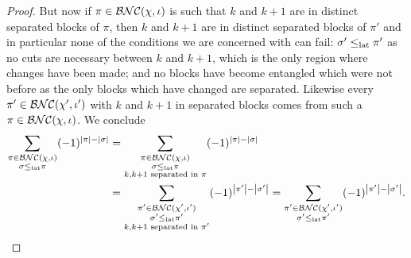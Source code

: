 \begin{proof}
	But now if $\pi \in \mathcal{BNC}(\chi, \iota)$ is such that $k$ and $k+1$ are in distinct separated blocks of $\pi$, then $k$ and $k+1$ are in distinct separated blocks of $\pi'$ and in particular none of the conditions we are concerned with can fail: $\sigma' \leq_{{\operatorname{lat}}}\pi'$ as no cuts are necessary between $k$ and $k+1$, which is the only region where changes have been made; and no blocks have become entangled which were not before as the only blocks which have changed are separated.
	Likewise every $\pi' \in \mathcal{BNC}(\chi', \iota')$ with $k$ and $k+1$ in separated blocks comes from such a $\pi \in \mathcal{BNC}(\chi, \iota)$.
	We conclude
	\begin{align*}
		\sum_{\substack{\pi\in\mathcal{BNC}(\chi, \iota)\\\sigma\leq_{{\operatorname{lat}}}\pi}} (-1)^{\left|\pi\right| - \left|\sigma\right|}
		&= \sum_{\substack{\pi\in\mathcal{BNC}(\chi, \iota)\\\sigma\leq_{{\operatorname{lat}}}\pi \\ k, k+1 \text{ separated in } \pi}} (-1)^{\left|\pi\right| - \left|\sigma\right|} \\
		&= \sum_{\substack{\pi'\in\mathcal{BNC}(\chi', \iota')\\\sigma'\leq_{{\operatorname{lat}}}\pi' \\ k, k+1 \text{ separated in } \pi'}} (-1)^{\left|\pi'\right| - \left|\sigma'\right|}
		= \sum_{\substack{\pi'\in\mathcal{BNC}(\chi', \iota')\\\sigma'\leq_{{\operatorname{lat}}}\pi'}} (-1)^{\left|\pi'\right| - \left|\sigma'\right|}.
	\end{align*}


\end{proof}
